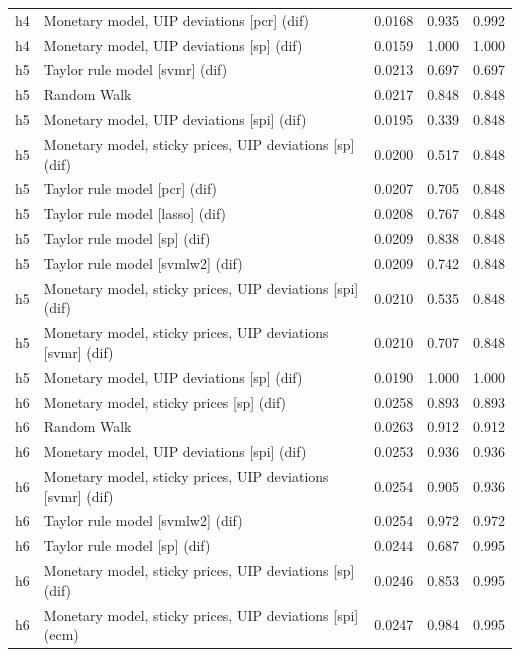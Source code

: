 \begin{ThreePartTable}
\begin{longtable}[t]{cp{5.5cm}ccc}
h4 & \raggedright Monetary model, UIP deviations [pcr] (dif) & 0.0168 & 0.935 & 0.992\\
h4 & \raggedright Monetary model, UIP deviations [sp] (dif) & 0.0159 & 1.000 & 1.000\\
\addlinespace
h5 & \raggedright Taylor rule model [svmr] (dif) & 0.0213 & 0.697 & 0.697\\
h5 & \raggedright Random Walk & 0.0217 & 0.848 & 0.848\\
h5 & \raggedright Monetary model, UIP deviations [spi] (dif) & 0.0195 & 0.339 & 0.848\\
h5 & \raggedright Monetary model, sticky prices, UIP deviations [sp] (dif) & 0.0200 & 0.517 & 0.848\\
h5 & \raggedright Taylor rule model [pcr] (dif) & 0.0207 & 0.705 & 0.848\\
h5 & \raggedright Taylor rule model [lasso] (dif) & 0.0208 & 0.767 & 0.848\\
h5 & \raggedright Taylor rule model [sp] (dif) & 0.0209 & 0.838 & 0.848\\
h5 & \raggedright Taylor rule model [svmlw2] (dif) & 0.0209 & 0.742 & 0.848\\
h5 & \raggedright Monetary model, sticky prices, UIP deviations [spi] (dif) & 0.0210 & 0.535 & 0.848\\
h5 & \raggedright Monetary model, sticky prices, UIP deviations [svmr] (dif) & 0.0210 & 0.707 & 0.848\\
h5 & \raggedright Monetary model, UIP deviations [sp] (dif) & 0.0190 & 1.000 & 1.000\\
\addlinespace
h6 & \raggedright Monetary model, sticky prices [sp] (dif) & 0.0258 & 0.893 & 0.893\\
h6 & \raggedright Random Walk & 0.0263 & 0.912 & 0.912\\
h6 & \raggedright Monetary model, UIP deviations [spi] (dif) & 0.0253 & 0.936 & 0.936\\
h6 & \raggedright Monetary model, sticky prices, UIP deviations [svmr] (dif) & 0.0254 & 0.905 & 0.936\\
h6 & \raggedright Taylor rule model [svmlw2] (dif) & 0.0254 & 0.972 & 0.972\\
h6 & \raggedright Taylor rule model [sp] (dif) & 0.0244 & 0.687 & 0.995\\
h6 & \raggedright Monetary model, sticky prices, UIP deviations [sp] (dif) & 0.0246 & 0.853 & 0.995\\
h6 & \raggedright Monetary model, sticky prices, UIP deviations [spi] (ecm) & 0.0247 & 0.984 & 0.995\\

\end{longtable}
\end{ThreePartTable}
